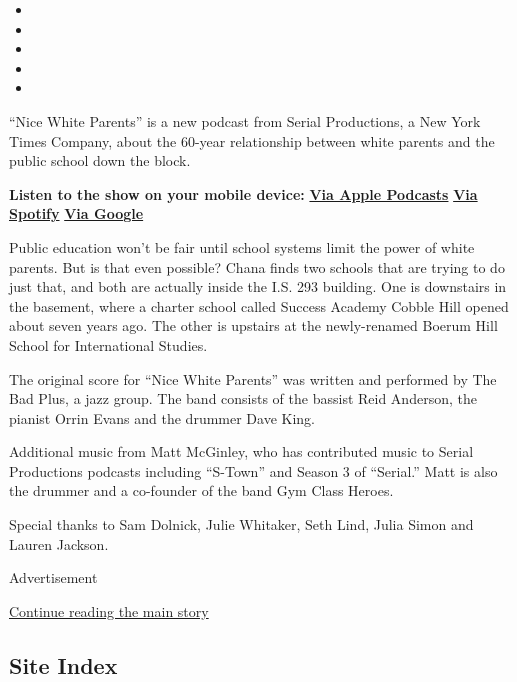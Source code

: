 \begin{itemize}
\item
\item
\item
\item
\item
\end{itemize}

``Nice White Parents'' is a new podcast from Serial Productions, a New
York Times Company, about the 60-year relationship between white parents
and the public school down the block.

\textbf{Listen to the show on your mobile device:}
\textbf{\href{https://podcasts.apple.com/us/podcast/nice-white-parents/id1524080195}{Via
Apple Podcasts}} \textbf{\textbar{}}
\textbf{\href{https://open.spotify.com/show/7oBSLCZFCgpdCaBjIG8mLV?si=YcEPLD3xT2ejXmpQz-tRpw}{Via
Spotify}} \textbf{\textbar{}}
\textbf{\href{https://podcasts.google.com/feed/aHR0cHM6Ly9yc3MuYXJ0MTkuY29tL25pY2Utd2hpdGUtcGFyZW50cw}{Via
Google}}

Public education won't be fair until school systems limit the power of
white parents. But is that even possible? Chana finds two schools that
are trying to do just that, and both are actually inside the I.S. 293
building. One is downstairs in the basement, where a charter school
called Success Academy Cobble Hill opened about seven years ago. The
other is upstairs at the newly-renamed Boerum Hill School for
International Studies.

The original score for ``Nice White Parents'' was written and performed
by The Bad Plus, a jazz group. The band consists of the bassist Reid
Anderson, the pianist Orrin Evans and the drummer Dave King.

Additional music from Matt McGinley, who has contributed music to Serial
Productions podcasts including ``S-Town'' and Season 3 of ``Serial.''
Matt is also the drummer and a co-founder of the band Gym Class Heroes.

Special thanks to Sam Dolnick, Julie Whitaker, Seth Lind, Julia Simon
and Lauren Jackson.

Advertisement

\protect\hyperlink{after-bottom}{Continue reading the main story}

\hypertarget{site-index}{%
\subsection{Site Index}\label{site-index}}

